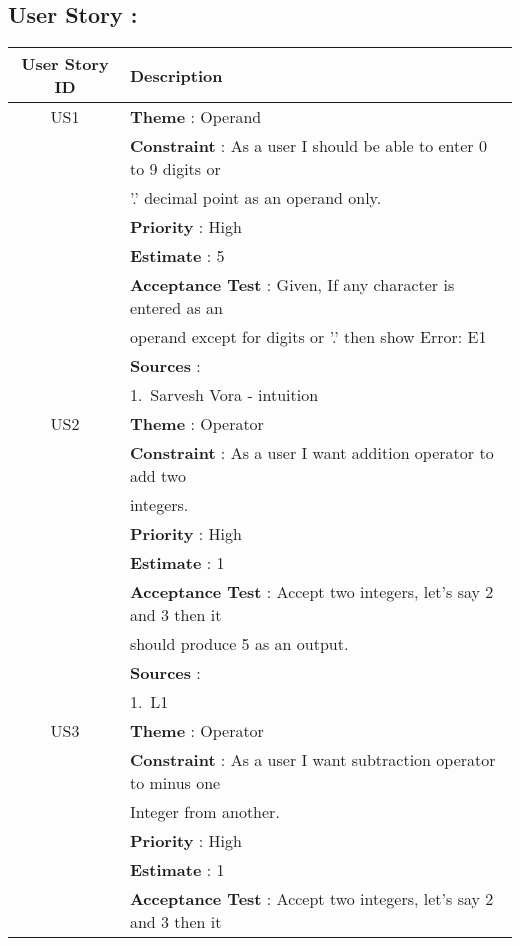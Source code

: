 \documentclass{article}
\begin{document}
\subsection{User Story : }
\begin{longtable}{|| c || l ||}
        \hline
        \hline
        \textbf{User Story ID} & \textbf{Description} \\
        \hline
        \hline
         US1 & \textbf{Theme} : Operand \\
         & \textbf{Constraint} : As a user I should be able to enter 0 to 9 digits or \\ & '.' decimal point as an operand only. \\ 
         & \textbf{Priority} : High \\
         & \textbf{Estimate} : 5 \\
         & \textbf{Acceptance Test} : Given, If any character is entered as an \\
         & operand except for digits or '.' then show Error: E1 \\
         & \textbf{Sources} : \\
         & 1.~Sarvesh Vora - intuition \\
         \hline
         US2 & \textbf{Theme} : Operator \\
         & \textbf{Constraint} : As a user I want addition operator to add two \\
         & integers. \\
         & \textbf{Priority} : High \\
         & \textbf{Estimate} : 1 \\
         & \textbf{Acceptance Test} : Accept two integers, let's say 2 and 3 then it \\
         & should produce 5 as an output. \\
         & \textbf{Sources} : \\
         & 1.~L1 \\
         \hline
         US3 & \textbf{Theme} : Operator \\
         & \textbf{Constraint} : As a user I want subtraction operator to minus one \\ 
         & Integer from another. \\
         & \textbf{Priority} : High \\
         & \textbf{Estimate} : 1 \\
         & \textbf{Acceptance Test} : Accept two integers, let's say 2 and 3 then it \\

\end{longtable}
\end{document}
